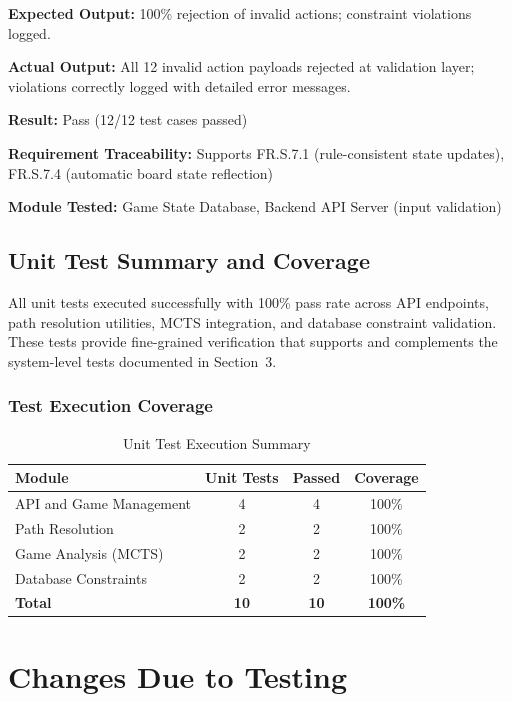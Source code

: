 \documentclass[12pt, titlepage]{article}
\begin{document}
\begin{enumerate}
\textbf{Expected Output:} 100\% rejection of invalid actions; constraint violations logged.

\textbf{Actual Output:} All 12 invalid action payloads rejected at validation layer; violations correctly logged with detailed error messages.

\textbf{Result:} Pass (12/12 test cases passed)

\textbf{Requirement Traceability:} Supports FR.S.7.1 (rule-consistent state updates), FR.S.7.4 (automatic board state reflection)

\textbf{Module Tested:} Game State Database, Backend API Server (input validation)

\end{enumerate}

\subsection{Unit Test Summary and Coverage}

All unit tests executed successfully with 100\% pass rate across API endpoints, path resolution utilities, MCTS integration, and database constraint validation. These tests provide fine-grained verification that supports and complements the system-level tests documented in Section~3.

\subsubsection{Test Execution Coverage}

\begin{table}[H]
\centering
\begin{tabular}{|l|c|c|c|}
\hline
\textbf{Module} & \textbf{Unit Tests} & \textbf{Passed} & \textbf{Coverage} \\ \hline
API and Game Management & 4 & 4 & 100\% \\ \hline
Path Resolution & 2 & 2 & 100\% \\ \hline
Game Analysis (MCTS) & 2 & 2 & 100\% \\ \hline
Database Constraints & 2 & 2 & 100\% \\ \hline
\textbf{Total} & \textbf{10} & \textbf{10} & \textbf{100\%} \\ \hline
\end{tabular}
\caption{Unit Test Execution Summary}
\label{tab:unit-test-summary}
\end{table}



\section{Changes Due to Testing}
\end{document}
